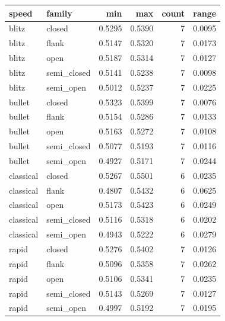 \begin{tabular}{llrrrr}
\toprule
speed & family & min & max & count & range \\
\midrule
blitz & closed & 0.5295 & 0.5390 & 7 & 0.0095 \\
blitz & flank & 0.5147 & 0.5320 & 7 & 0.0173 \\
blitz & open & 0.5187 & 0.5314 & 7 & 0.0127 \\
blitz & semi_closed & 0.5141 & 0.5238 & 7 & 0.0098 \\
blitz & semi_open & 0.5012 & 0.5237 & 7 & 0.0225 \\
bullet & closed & 0.5323 & 0.5399 & 7 & 0.0076 \\
bullet & flank & 0.5154 & 0.5286 & 7 & 0.0133 \\
bullet & open & 0.5163 & 0.5272 & 7 & 0.0108 \\
bullet & semi_closed & 0.5077 & 0.5193 & 7 & 0.0116 \\
bullet & semi_open & 0.4927 & 0.5171 & 7 & 0.0244 \\
classical & closed & 0.5267 & 0.5501 & 6 & 0.0235 \\
classical & flank & 0.4807 & 0.5432 & 6 & 0.0625 \\
classical & open & 0.5173 & 0.5423 & 6 & 0.0249 \\
classical & semi_closed & 0.5116 & 0.5318 & 6 & 0.0202 \\
classical & semi_open & 0.4943 & 0.5222 & 6 & 0.0279 \\
rapid & closed & 0.5276 & 0.5402 & 7 & 0.0126 \\
rapid & flank & 0.5096 & 0.5358 & 7 & 0.0262 \\
rapid & open & 0.5106 & 0.5341 & 7 & 0.0235 \\
rapid & semi_closed & 0.5143 & 0.5269 & 7 & 0.0127 \\
rapid & semi_open & 0.4997 & 0.5192 & 7 & 0.0195 \\
\bottomrule
\end{tabular}
